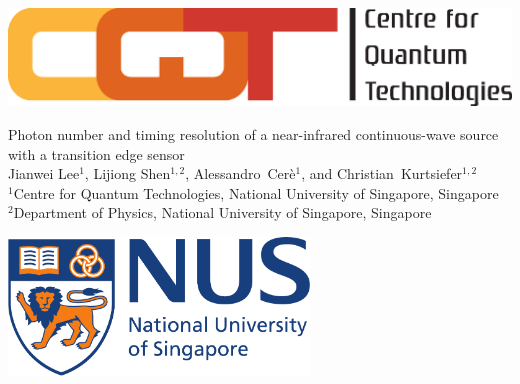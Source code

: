 \documentclass[portrait,a0,final]{a0poster}
\newenvironment{poster}{
  \begin{center}
  \begin{minipage}[c]{0.98\textwidth}
}{
  \end{minipage}
  \end{center}
}
\begin{document}
\begin{poster}
\large \sf

\begin{center}

      \begin{minipage}[c]{0.05\textwidth}
        \begin{center}
          \includegraphics[width=14cm,angle=0]{figures/CQT_Logo.eps}
        \end{center}
      \end{minipage}\hspace{10cm}
      \begin{minipage}[c]{0.7\textwidth}
        \begin{center}
          {\sc \huge
          Photon number and timing resolution of a near-infrared continuous-wave source with a transition edge sensor}\\[9mm]
          {\large Jianwei Lee$^1$,
          Lijiong Shen$^{1,2}$,
          Alessandro~Cer\`e$^1$,
          and Christian~Kurtsiefer$^{1,2}$}\\[9mm]
          {$^1$Centre for Quantum Technologies, National University of Singapore, Singapore\\
           $^2$Department of Physics, National University of Singapore, Singapore}
        \end{center}
      \end{minipage}
      \begin{minipage}[c]{.1\textwidth}
        \begin{center}
          \includegraphics[width=8cm,angle=0]{figures/NUS_Logo.pdf}
        \end{center}
      \end{minipage}
\end{center}


\end{poster}
\end{document}
